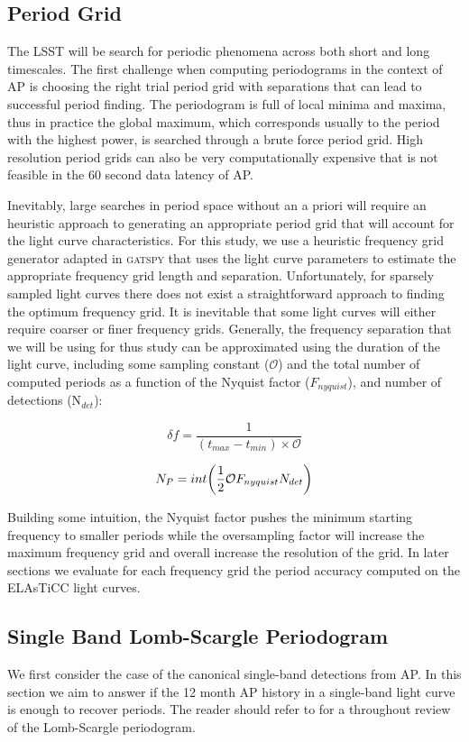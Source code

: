 \documentclass[DM,authoryear,toc]{lsstdoc}
\begin{document}
\subsection{Period Grid}
The LSST will be search for periodic phenomena across both short and long timescales. The first challenge when computing periodograms in the context of AP is choosing the right trial period grid with separations that can lead to successful period finding. The periodogram is full of local minima and maxima, thus in practice the global maximum, which corresponds usually to the period with the highest power, is searched through a brute force period grid. High resolution period grids can also be very computationally expensive that is not feasible in the 60 second data latency of AP. 

Inevitably, large searches in period space without an a priori will require an heuristic approach to generating an appropriate period grid that will account for the light curve characteristics. For this study, we use a heuristic frequency grid generator adapted in \textsc{gatspy} that uses the light curve parameters to estimate the appropriate frequency grid length and separation. Unfortunately, for sparsely sampled light curves there does not exist a straightforward approach to finding the optimum frequency grid. It is inevitable that some light curves will either require coarser or finer frequency grids. 
Generally, the frequency separation that we will be using for thus study can be approximated using the duration of the light curve, including some sampling constant ($\mathcal{O}$) and the total number of computed periods as a function of the Nyquist factor ($F_{nyquist}$), and number of detections (N$_{det}$): 

\begin{equation}
\delta f = \frac{1}{(t_{max} - t_{min}) \times \mathcal{O}}
\end{equation}

\begin{equation}
N_{P} = int \bigg{(} \frac{1}{2} \mathcal{O} F_{nyquist} N_{det} \bigg{)}
\end{equation}

Building some intuition, the Nyquist factor pushes the minimum starting frequency to smaller periods while the oversampling factor will increase the maximum frequency grid and overall increase the resolution of the grid. In later sections we evaluate for each frequency grid the period accuracy computed on the ELAsTiCC light curves. 

\subsection{Single Band Lomb-Scargle Periodogram}
We first consider the case of the canonical single-band detections from AP. In this section we aim to answer  if the 12 month AP history in a single-band light curve is enough to recover periods. The reader should refer to \citet{VanderPlas:VP2015} for a throughout review of the Lomb-Scargle periodogram.   
\end{document}
